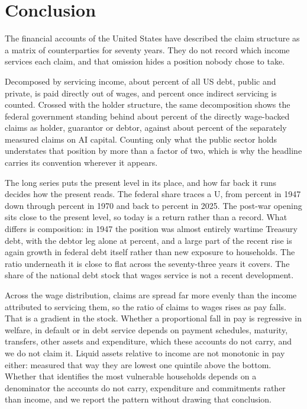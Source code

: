 \section{Conclusion}
\label{sec:conclusion}

The financial accounts of the United States have described the claim structure as a matrix of
counterparties for seventy years. They do not record which income services each claim, and that
omission hides a position nobody chose to take.

Decomposed by servicing income, about  percent of all US debt, public and
private, is paid directly out of wages, and  percent once indirect
servicing is counted. Crossed with the holder structure, the same decomposition shows the federal
government standing behind about  percent of the directly wage-backed
claims as holder, guarantor or debtor, against about  percent of
the separately measured claims on AI capital. Counting only what the public sector holds
understates that position by more than a factor of two, which is why the headline carries its
convention wherever it appears.

The long series puts the present level in its place, and how far back it runs decides how the
present reads. The federal share traces a U, from  percent in 1947 down
through  percent in 1970 and back to  percent in 2025.
The post-war opening sits close to the present level, so today is a return rather than a record.
What differs is composition: in 1947 the position was almost entirely wartime Treasury debt, with
the debtor leg alone at  percent, and a large part of the recent rise is
again growth in federal debt itself rather than new exposure to households. The ratio underneath
it is close to flat across the seventy-three years it covers. The share of the national debt
stock that wages service is not a recent development.

Across the wage distribution, claims are spread far more evenly than the income attributed to
servicing them, so the ratio of claims to wages rises as pay falls. That is a gradient in the
stock. Whether a proportional fall in pay is regressive in welfare, in default or in debt service
depends on payment schedules, maturity, transfers, other assets and expenditure, which these
accounts do not carry, and we do not claim it. Liquid
assets relative to income are not monotonic in pay either: measured that way they are lowest one
quintile above the bottom. Whether that identifies the most vulnerable households depends on a
denominator the accounts do not carry, expenditure and commitments rather than income, and we
report the pattern without drawing that conclusion.

